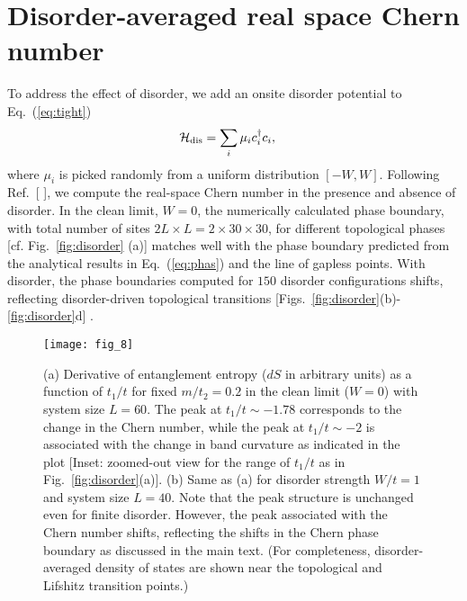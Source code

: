 \documentclass[aps,prb,showpacs,twocolumn,floats]{revtex4-1}
\begin{document}
\section{Disorder-averaged real space Chern number}
To address the effect of disorder, we add an onsite disorder potential to  Eq.~(\ref{eq:tight}) 
\begin{align}
\mathcal{H_{\rm dis}} & =\sum_i \mu_i c_i^\dagger c_i,
\end{align}
where $\mu_i$ is picked randomly from a uniform distribution $\left[-W,W\right]$.
Following  Ref.~[ ], we compute the real-space Chern number in 
the presence and absence of disorder.
In the clean limit, $W = 0$, the numerically calculated phase boundary, with total number of sites $2L\times L = 2\times 30\times 30$, for different topological phases [cf. Fig.~\ref{fig:disorder} (a)] matches well with the phase boundary predicted from the analytical results in Eq.~(\ref{eq:phas}) and the line of gapless points. 
With disorder, the phase boundaries computed for $150$ disorder configurations shifts, reflecting
disorder-driven topological transitions [Figs.~\ref{fig:disorder}(b)-\ref{fig:disorder}d] .
\begin{figure}
\texttt{[image: fig\_8]}
\caption{(a) Derivative of entanglement entropy ($dS$ in arbitrary units) as a function of $t_1/t$ for fixed $m/t_2=0.2$ in the clean limit ($W=0$) with system size $L = 60$. 
The peak at $t_1/t\sim-1.78$ corresponds to the change in the Chern number, while the peak at $t_1/t\sim -2$ is associated with the change in 
band curvature as indicated in the plot [Inset: zoomed-out view for the range of $t_1/t$ as in Fig.~\ref{fig:disorder}(a)].
 (b) Same as (a) for disorder strength $W/t=1$ and system size $L = 40$. 
Note that the peak structure is unchanged even for finite disorder. However, the peak associated with the Chern number
shifts, reflecting the shifts in the Chern phase boundary as discussed in the main text. 
(For completeness, disorder-averaged density of states are shown near the topological and Lifshitz transition points.)}
\label{fig:ee}
\end{figure}
\end{document}
